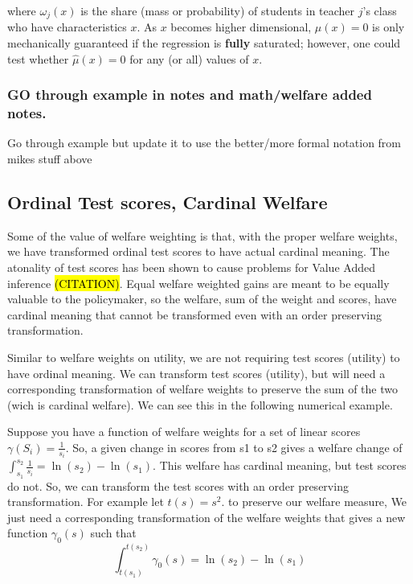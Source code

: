 \documentclass{article}
\theoremstyle{definition}
\theoremstyle{definition}
\theoremstyle{definition}
\theoremstyle{definition}
\begin{document}
    \noindent where $\omega_j(x)$ is the share (mass or probability) of students in teacher $j$'s class who have characteristics $x$. As $x$ becomes higher dimensional, $\mu(x)=0$ is only mechanically guaranteed if the regression is \textbf{fully} saturated; however, one could test whether $\hat{\mu}(x)=0$ for any (or all) values of $x$.
    
    \subsubsection{GO through example in notes and math/welfare added notes. }
        Go through example but update it to use the better/more formal notation from mikes stuff above
   
   \subsection{Ordinal Test scores, Cardinal Welfare}
        
    Some of the value of welfare weighting is that, with the proper welfare weights, we have transformed ordinal test scores to have actual cardinal meaning. The atonality of test scores has been shown to cause problems for Value Added inference \hl{(CITATION)}. Equal welfare weighted gains are meant to be equally valuable to the policymaker, so the welfare, sum of the weight and scores, have cardinal meaning that cannot be transformed even with an order preserving transformation. 
    
    Similar to welfare weights on utility, we are not requiring test scores (utility) to have ordinal meaning. We can transform test scores (utility), but will need a corresponding transformation of welfare weights to preserve the sum of the two (wich is cardinal welfare). We can see this in the following numerical example. 
    
    Suppose you have a function of welfare weights for a set of linear scores $\gamma(S_i) = \frac{1}{s_i}$. So, a given change in scores from s1 to s2 gives a welfare change of $\int_{s_1}^{s_2} \frac{1}{s_i} = \ln(s_2)-\ln(s_1)$. This welfare has cardinal meaning, but test scores do not. So, we can transform the test scores with an order preserving transformation. For example let $t(s) = s^2$. to preserve our welfare measure, We just need a corresponding transformation of the welfare weights that gives a new function $\gamma_0(s)$ such that 
    $$\int_{t(s_1)}^{t(s_2)}\gamma_0(s)  = \ln(s_2)-\ln(s_1)$$
    
\end{document}
